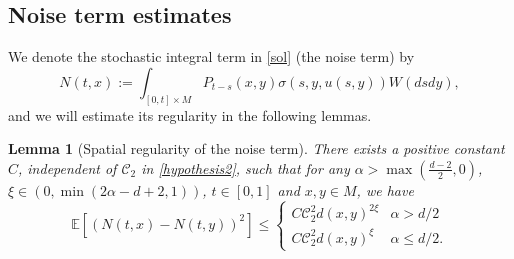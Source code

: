 \documentclass[12pt]{amsart}
\newtheorem{lemma}{Lemma}[section]
\numberwithin{equation}{section}
\newcommand{\1}{\mathbf{1}}
\begin{document}
\subsection{Noise term estimates}
We denote the stochastic integral term in \eqref{sol} (the noise term) by
\begin{equation}
    \label{noise_term}
    N(t,x):=\int_{[0,t]\times M}P_{t-s}(x,y)\sigma(s,y,u(s,y))W(dsdy),
\end{equation}
and we will estimate its regularity in the following lemmas.

\begin{lemma}[Spatial regularity of the noise term]\label{spatialregularity} There exists a positive constant $C$, independent of $\mathcal{C}_2$ in \eqref{hypothesis2}, such that for any $\alpha>\max\left(\frac{d-2}{2},0\right)$, $\xi\in(0,\min\left(2\alpha-d+2,1\right))$, $t\in[0,1]$ and $x,y\in M$, we have
\begin{equation*}
\mathbb{E}\left[(N(t,x)-N(t,y))^2\right]\leq\begin{cases}
    C\mathcal{C}_2^2d(x,y)^{2\xi} &\alpha>d/2\\
    C\mathcal{C}_2^2d(x,y)^{\xi} &\alpha\leq d/2.
    \end{cases}
\end{equation*}
\end{lemma}
\end{document}
